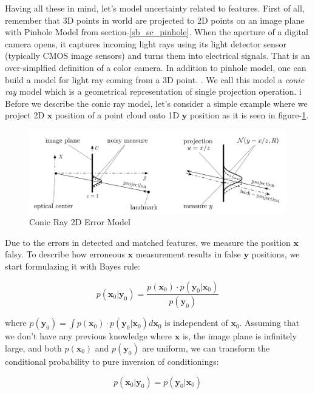 \documentclass[a4paper]{report}
\numberwithin{figure}{section}
\begin{document}
Having all these in mind, let's model uncertainty related to features.
First of all, remember that 3D points in world are projected to 2D points on an image plane with 
Pinhole Model from section-\ref{sb_sc_pinhole}. When the aperture of a digital 
camera opens, it captures incoming light rays using its light detector sensor 
(typically CMOS image sensors) and turns them into electrical signals. That 
is an over-simplfied definition of a color camera. In addition to pinhole 
model, one can build a model for light ray coming from a 3D point.
. We call this model 
a \textit{conic ray} model which is a geometrical representation of 
single projection operation. i
Before we describe the conic ray model, let's consider a simple example where we 
project 2D $\mathbf{x}$ position of a point cloud onto 1D $\mathbf{y}$ position
as it is seen in figure-\ref{fig:conic_ray_2d_error_model}.


\begin{figure}[H]
	\centering
  \includegraphics[width=0.7\linewidth,natwidth=640,natheight=640]
  {fig/ref_imgs/conic_ray_2d_model.png}
  \caption{Conic Ray 2D Error Model}
	\label{fig:conic_ray_2d_error_model}
\end{figure}

Due to the errors in detected and matched features, 
we measure the position $\mathbf{x}$ falsy. To describe how erroneous $\mathbf{x}$ 
measurement results in false $\mathbf{y}$ positions, 
we start formulazing it with Bayes rule:

\begin{equation}
  p(\mathbf{x}_0|\mathbf{y}_0) = \frac{p(\mathbf{x}_0) \cdot p(\mathbf{y}_0|\mathbf{x}_0)}{p(\mathbf{y}_0)}
\end{equation}

where $p(\mathbf{y}_0) = \int p(\mathbf{x}_0) \cdot p(\mathbf{y}_0|\mathbf{x}_0) d\mathbf{x}_0$
is independent of $\mathbf{x}_0$. Assuming that we don't have any previous 
knowledge where $\mathbf{x}$ is, the image plane is infinitely 
large, and both $p(\mathbf{x}_0)$ and $p(\mathbf{y}_0)$ are uniform, we can transform 
the conditional probability to pure inversion of conditionings:

\begin{equation}
  p(\mathbf{x}_0|\mathbf{y}_0) = p(\mathbf{y}_0|\mathbf{x}_0)
\end{equation}
\end{document}
